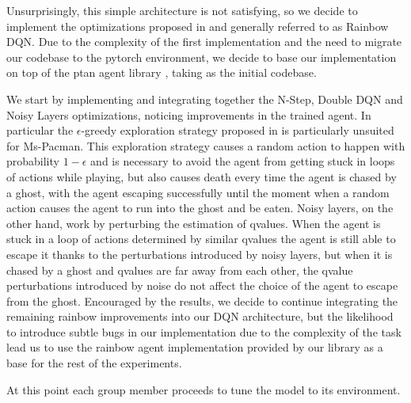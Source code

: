 \documentclass[10pt,twocolumn,letterpaper]{article}
\begin{document}
Unsurprisingly, this simple architecture is not satisfying, so we decide to implement the optimizations proposed in \cite{DBLP:journals/corr/abs-1710-02298} and generally referred to as Rainbow DQN. Due to the complexity of the first implementation and the need to migrate our codebase to the pytorch environment, we decide to base our implementation on top of the ptan agent library \cite{ptan}, taking \cite{packtrepo} as the initial codebase.

We start by implementing and integrating together the N-Step, Double DQN and Noisy Layers optimizations, noticing improvements in the trained agent. In particular the $\epsilon$-greedy exploration strategy proposed in \cite{DBLP:journals/corr/MnihKSGAWR13} is particularly unsuited for Ms-Pacman. This exploration strategy causes a random action to happen with probability $1 - \epsilon$ and is necessary to avoid the agent from getting stuck in loops of actions while playing, but also causes death every time the agent is chased by a ghost, with the agent escaping successfully until the moment when a random action causes the agent to run into the ghost and be eaten.
Noisy layers, on the other hand, work by perturbing the estimation of qvalues. When the agent is stuck in a loop of actions determined by similar qvalues the agent is still able to escape it thanks to the perturbations introduced by noisy layers, but when it is chased by a ghost and qvalues are far away from each other, the qvalue perturbations introduced by noise do not affect the choice of the agent to escape from the ghost.
Encouraged by the results, we decide to continue integrating the remaining rainbow improvements into our DQN architecture, but the likelihood to introduce subtle bugs in our implementation due to the complexity of the task lead us to use the rainbow agent implementation provided by our library as a base for the rest of the experiments.

At this point each group member proceeds to tune the model to its environment.
\end{document}
